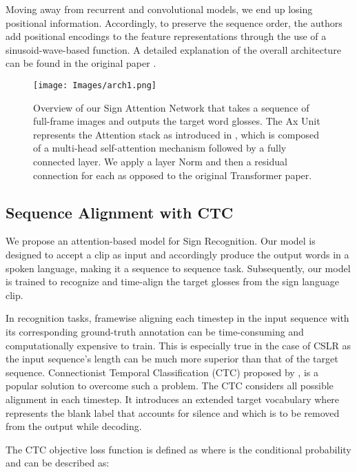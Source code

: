 \documentclass[a4paper,conference]{IEEEtran}
\begin{document}
	
Moving away from recurrent and convolutional models, we end up losing positional information. Accordingly, to preserve the sequence order, the authors add positional encodings to the feature representations through the use of a sinusoid-wave-based function.
A detailed explanation of the overall architecture can be found in the original paper \cite{vaswani2017attention}.

\begin{figure*}[t]
\centering
\texttt{[image: Images/arch1.png]}
\caption{Overview of our Sign Attention Network that takes a sequence of full-frame images and outputs the target word glosses. The Ax Unit represents the Attention stack as introduced in \cite{vaswani2017attention}, which is composed of a multi-head self-attention mechanism followed by a fully connected layer. We apply a layer Norm \cite{ba2016layer} and then a residual connection for each as opposed to the original Transformer paper.}
\label{fig:1}
\end{figure*}

\subsection{Sequence Alignment with CTC}
    
We propose an attention-based model for Sign Recognition. Our model is designed to accept a clip as input and accordingly produce the output words in a spoken language, making it a sequence to sequence task. Subsequently, our model is trained to recognize and time-align the target glosses from the sign language clip.

In recognition tasks, framewise aligning each timestep in the input sequence  with its corresponding ground-truth annotation can be time-consuming and computationally expensive to train. This is especially true in the case of CSLR as the input sequence's length can be much more superior than that of the target sequence. Connectionist Temporal Classification (CTC) proposed by \cite{graves2006connectionist}, is a popular solution to overcome such a problem. The CTC considers all possible alignment in each timestep. It introduces an extended target vocabulary  where  represents the blank label that accounts for silence and which is to be removed from the output while decoding. 

The CTC objective loss function is defined as  where  is the conditional probability and can be described as:
\end{document}
